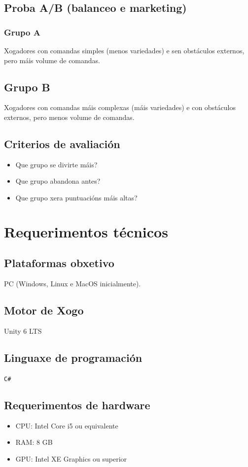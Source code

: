 \documentclass{report}  %
\begin{document}
\subsection{Proba A/B (balanceo e marketing)}
\subsubsection{Grupo A}
Xogadores con comandas simples (menos variedades) e sen obstáculos externos, pero máis volume de comandas.
\subsection{Grupo B}
Xogadores con comandas máis complexas (máis variedades) e con obstáculos externos, pero menos volume de comandas.
\subsection{Criterios de avaliación}
\begin{itemize}
    \item Que grupo se divirte máis?
    \item Que grupo abandona antes?
    \item Que grupo xera puntuacións máis altas?
\end{itemize}


\section{Requerimentos técnicos}
\subsection{Plataformas obxetivo}
PC (Windows, Linux e MacOS inicialmente).
\subsection{Motor de Xogo}
Unity 6 LTS
\subsection{Linguaxe de programación}
\texttt{C\#}
\subsection{Requerimentos de hardware}
\begin{itemize}
    \item CPU: Intel Core i5 ou equivalente
    \item RAM: 8 GB
    \item GPU: Intel XE Graphics ou superior
\end{itemize}
\end{document}
